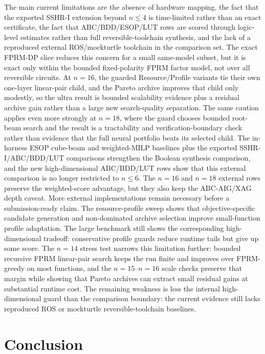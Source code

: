 \documentclass[11pt]{article}
\begin{document}
The main current limitations are the absence of hardware mapping, the fact that
the exported SSHR-I extension beyond $n\leq 4$ is time-limited rather than an
exact certificate, the fact that ABC/BDD/ESOP/LUT rows are scored through
logic-level estimates rather than full reversible-toolchain synthesis, and the
lack of a reproduced external ROS/mockturtle toolchain in the comparison set.
The exact FPRM-DP slice reduces this concern for a small same-model subset, but
it is exact only within the bounded fixed-polarity FPRM factor model, not over
all reversible circuits.
At $n=16$, the guarded Resource/Profile variants tie their own one-layer
linear-pair child, and the Pareto archive improves that child only modestly, so
the ultra result is bounded scalability evidence plus a residual archive gain
rather than a large new search-quality separation.  The same caution applies even more
strongly at $n=18$, where the guard chooses bounded root-beam search and the
result is a tractability and verification-boundary check rather than evidence
that the full neural portfolio beats its selected child.
The in-harness ESOP cube-beam and weighted-MILP baselines plus the exported
SSHR-I/ABC/BDD/LUT comparisons strengthen the Boolean synthesis comparison, and
the new high-dimensional ABC/BDD/LUT rows show that this external comparison is
no longer restricted to $n\leq 6$.  The $n=16$ and $n=18$ external rows preserve
the weighted-score advantage, but they also keep the ABC-AIG/XAG depth caveat.
More external implementations remain necessary before a submission-ready claim.
The resource-profile sweep shows that objective-specific candidate generation
and non-dominated archive selection improve small-function profile adaptation.
The large benchmark still shows the corresponding high-dimensional tradeoff:
conservative profile guards reduce runtime tails but give up some score.  The
$n=14$ stress test narrows this limitation further: bounded recursive FPRM
linear-pair search keeps the run finite and improves over FPRM-greedy on most
functions, and the $n=15$--$n=16$ scale checks preserve that margin while
showing that Pareto archives can extract small residual gains at substantial
runtime cost.  The remaining weakness is less the internal high-dimensional
guard than the comparison boundary: the current evidence still lacks
reproduced ROS or mockturtle reversible-toolchain
baselines.

\section{Conclusion}
\end{document}
